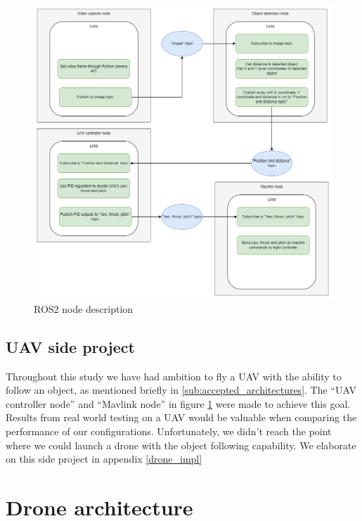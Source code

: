 \begin{figure}[h!]
    \centering
    \includegraphics[width=\textwidth]{a_martinbilder/nodes.drawio.png}
    \caption{ROS2 node description}
    \label{fig:node_description}
\end{figure}

\subsection{UAV side project}

Throughout this study we have had ambition to fly a UAV with the ability to follow an object, as mentioned briefly in \ref{sub:accepted_architectures}. The “UAV controller node” and “Mavlink node” in figure \ref{fig:node_description} were made to achieve this goal. Results from real world testing on a UAV would be valuable when comparing the performance of our configurations. Unfortunately, we didn’t reach the point where we could launch a drone with the object following capability. We elaborate on this side project in appendix \ref{drone_impl}




\section{Drone architecture}

